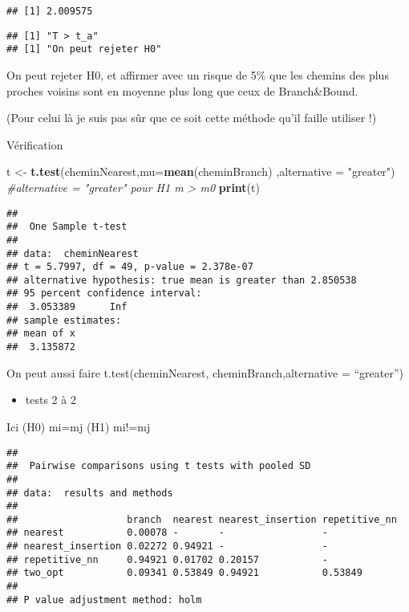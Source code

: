 \documentclass[]{article}
\newenvironment{Shaded}{\begin{snugshade}}{\end{snugshade}}
\newcommand{\CommentTok}[1]{\textcolor[rgb]{0.56,0.35,0.01}{\textit{#1}}}
\newcommand{\DataTypeTok}[1]{\textcolor[rgb]{0.13,0.29,0.53}{#1}}
\newcommand{\KeywordTok}[1]{\textcolor[rgb]{0.13,0.29,0.53}{\textbf{#1}}}
\newcommand{\NormalTok}[1]{#1}
\newcommand{\StringTok}[1]{\textcolor[rgb]{0.31,0.60,0.02}{#1}}
\providecommand{\tightlist}{%
  \setlength{\itemsep}{0pt}\setlength{\parskip}{0pt}}
\begin{document}
\begin{verbatim}
## [1] 2.009575
\end{verbatim}

\begin{verbatim}
## [1] "T > t_a"
## [1] "On peut rejeter H0"
\end{verbatim}

On peut rejeter H0, et affirmer avec un risque de 5\% que les chemins
des plus proches voisins sont en moyenne plus long que ceux de
Branch\&Bound.

(Pour celui là je suis pas sûr que ce soit cette méthode qu'il faille
utiliser !)

Vérification

\begin{Shaded}
\begin{Highlighting}[]
\NormalTok{t <-}\StringTok{ }\KeywordTok{t.test}\NormalTok{(cheminNearest,}\DataTypeTok{mu=}\KeywordTok{mean}\NormalTok{(cheminBranch) ,}\DataTypeTok{alternative =} \StringTok{"greater"}\NormalTok{) }\CommentTok{#alternative = "greater" pour H1 m > m0}
\KeywordTok{print}\NormalTok{(t)}
\end{Highlighting}
\end{Shaded}

\begin{verbatim}
## 
##  One Sample t-test
## 
## data:  cheminNearest
## t = 5.7997, df = 49, p-value = 2.378e-07
## alternative hypothesis: true mean is greater than 2.850538
## 95 percent confidence interval:
##  3.053389      Inf
## sample estimates:
## mean of x 
##  3.135872
\end{verbatim}

On peut aussi faire t.test(cheminNearest, cheminBranch,alternative =
``greater'')

\begin{itemize}
\tightlist
\item
  tests 2 à 2
\end{itemize}

Ici (H0) mi=mj (H1) mi!=mj

\begin{verbatim}
## 
##  Pairwise comparisons using t tests with pooled SD 
## 
## data:  results and methods 
## 
##                   branch  nearest nearest_insertion repetitive_nn
## nearest           0.00078 -       -                 -            
## nearest_insertion 0.02272 0.94921 -                 -            
## repetitive_nn     0.94921 0.01702 0.20157           -            
## two_opt           0.09341 0.53849 0.94921           0.53849      
## 
## P value adjustment method: holm
\end{verbatim}
\end{document}
